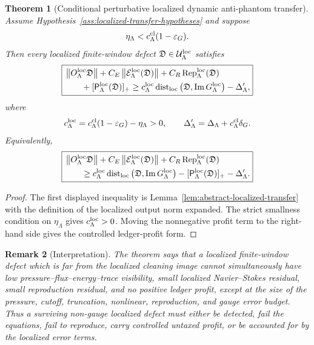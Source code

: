 \documentclass[11pt]{article}
\numberwithin{equation}{section}
\newtheorem{theorem}{Theorem}[section]
\newtheorem{remark}[theorem]{Remark}
\newcommand{\eps}{\varepsilon}
\newcommand{\Image}{\operatorname{Im}}
\newcommand{\Dist}{\operatorname{dist}}
\begin{document}
\begin{theorem}[Conditional perturbative localized dynamic anti-phantom transfer]
\label{thm:localized-dynamic-antiphantom-transfer}
Assume Hypothesis~\ref{ass:localized-transfer-hypotheses} and suppose
\[
        \eta_\Lambda
        <
        c_\Lambda^{\rm cl}(1-\eps_G).
\]
Then every localized finite-window defect
\(\mathfrak D\in\mathcal U_\Lambda^{\rm loc}\) satisfies
\[
\boxed{
\begin{aligned}
        &\left\|O_\Lambda^{\rm loc}\mathfrak D\right\|
        +
        C_E
        \left\|\mathcal E_\Lambda^{\rm loc}(\mathfrak D)\right\|
        +
        C_R
        \operatorname{Rep}_\Lambda^{\rm loc}(\mathfrak D) \\
        &\qquad
        +
        [\mathsf P_\Lambda^{\rm loc}(\mathfrak D)]_+
        \ge
        c_\Lambda^{\rm loc}
        \Dist_{\rm loc}
        \left(
        \mathfrak D,
        \Image G_\Lambda^{\rm loc}
        \right)
        -
        \Delta_\Lambda',
\end{aligned}
}
\]
where
\[
        c_\Lambda^{\rm loc}
        =
        c_\Lambda^{\rm cl}(1-\eps_G)-\eta_\Lambda
        >0,
        \qquad
        \Delta_\Lambda'
        =
        \Delta_\Lambda+c_\Lambda^{\rm cl}\delta_G .
\]
Equivalently,
\[
\boxed{
\begin{aligned}
        &\left\|O_\Lambda^{\rm loc}\mathfrak D\right\|
        +
        C_E
        \left\|\mathcal E_\Lambda^{\rm loc}(\mathfrak D)\right\|
        +
        C_R
        \operatorname{Rep}_\Lambda^{\rm loc}(\mathfrak D) \\
        &\qquad\ge
        c_\Lambda^{\rm loc}
        \Dist_{\rm loc}
        \left(
        \mathfrak D,
        \Image G_\Lambda^{\rm loc}
        \right)
        -
        [\mathsf P_\Lambda^{\rm loc}(\mathfrak D)]_+
        -
        \Delta_\Lambda' .
\end{aligned}
}
\]
\end{theorem}

\begin{proof}
The first displayed inequality is Lemma~\ref{lem:abstract-localized-transfer}
with the definition of the localized output norm expanded.  The strict
smallness condition on \(\eta_\Lambda\) gives \(c_\Lambda^{\rm loc}>0\).
Moving the nonnegative profit term to the right-hand side gives the
controlled ledger-profit form.
\end{proof}

\begin{remark}[Interpretation]\label{rem:localized-transfer-interpretation}
The theorem says that a localized finite-window defect which is far from
the localized cleaning image cannot simultaneously have low
pressure--flux--energy--trace visibility, small localized Navier--Stokes
residual, small reproduction residual, and no positive ledger profit,
except at the size of the pressure, cutoff, truncation, nonlinear,
reproduction, and gauge error budget.  Thus a surviving non-gauge localized
defect must either be detected, fail the equations, fail to reproduce,
carry controlled untaxed profit, or be accounted for by the localized error
terms.
\end{remark}
\end{document}
